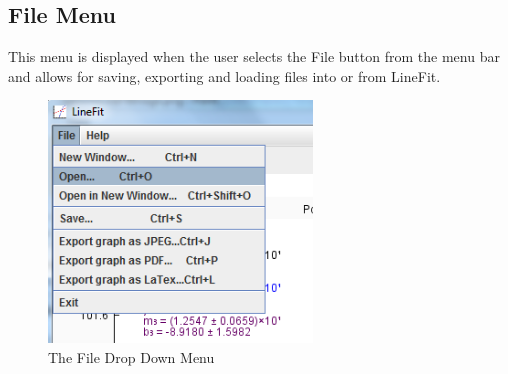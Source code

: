 \documentclass[titlepage,12pt]{article}
\begin{document}
\subsection{File Menu}

This menu is displayed when the user selects the File button from the menu bar and allows for saving, exporting and loading files into or from LineFit.

\begin{figure}[ht!]
\centering
\includegraphics[width=7cm]{images/FileMenu.png}
\caption{The File Drop Down Menu}
\end{figure}
\end{document}
